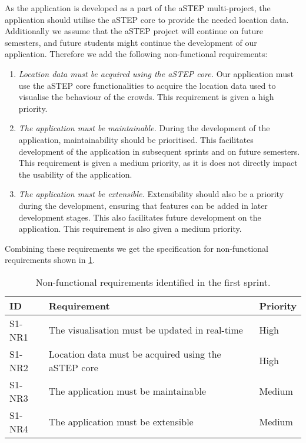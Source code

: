 As the application is developed as a part of the aSTEP multi-project, the application should utilise the aSTEP core to provide the needed location data. Additionally we assume that the aSTEP project will continue on future semesters, and future students might continue the development of our application. Therefore we add the following non-functional requirements:

\begin{enumerate}[resume]
    \item \emph{Location data must be acquired using the aSTEP core.} Our application must use the aSTEP core functionalities to acquire the location data used to visualise the behaviour of the crowds. This requirement is given a high priority.
    \item \emph{The application must be maintainable.} During the development of the application, maintainability should be prioritised. This facilitates development of the application in subsequent sprints and on future semesters. This requirement is given a medium priority, as it is does not directly impact the usability of the application.
    \item \emph{The application must be extensible.} Extensibility should also be a priority during the development, ensuring that features can be added in later development stages. This also facilitates future development on the application. This requirement is also given a medium priority.
\end{enumerate}

Combining these requirements we get the specification for non-functional requirements shown in \cref{tab:s1_nreqs}.

\begin{table}[h!]
	\centering
	\begin{tabularx}{\textwidth}{lXl}
		\toprule
		\textbf{ID} & \textbf{Requirement} & \textbf{Priority} \\
		\midrule 
		\rowcolor[HTML]{EFEFEF} 
		S1-NR1 & The visualisation must be updated in real-time & High \\
		S1-NR2 & Location data must be acquired using the aSTEP core & High \\
		\rowcolor[HTML]{EFEFEF} 
		S1-NR3 & The application must be maintainable & Medium \\
		S1-NR4 & The application must be extensible & Medium \\
		\bottomrule
	\end{tabularx}
	\caption{Non-functional requirements identified in the first sprint.}
	\label{tab:s1_nreqs}
\end{table}

